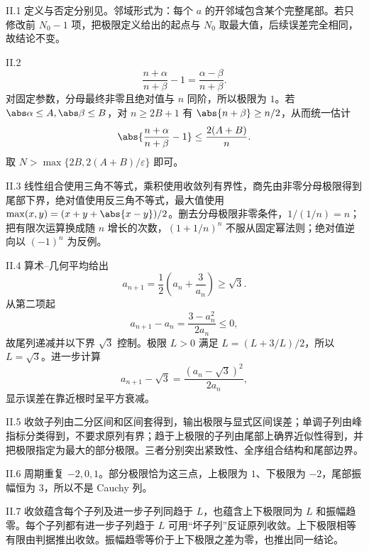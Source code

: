 \begin{solution}{II.1}
定义与否定分别见。邻域形式为：每个 \(a\) 的开邻域包含某个完整尾部。若只修改前 \(N_0-1\) 项，把极限定义给出的起点与 \(N_0\) 取最大值，后续误差完全相同，故结论不变。
\end{solution}

\begin{solution}{II.2}
\[
 \frac{n+\alpha}{n+\beta}-1=\frac{\alpha-\beta}{n+\beta}.
\]
对固定参数，分母最终非零且绝对值与 \(n\) 同阶，所以极限为 \(1\)。若
\(\abs\alpha\le A,\abs\beta\le B\)，对 \(n\ge2B+1\) 有
\(\abs{n+\beta}\ge n/2\)，从而统一估计
\[
 \abs{\frac{n+\alpha}{n+\beta}-1}
 \le\frac{2(A+B)}n.
\]
取 \(N>\max\{2B,2(A+B)/\varepsilon\}\) 即可。
\end{solution}

\begin{solution}{II.3}
线性组合使用三角不等式，乘积使用收敛列有界性，商先由非零分母极限得到尾部下界，绝对值使用反三角不等式，最大值使用
\(\max(x,y)=(x+y+\abs{x-y})/2\)。删去分母极限非零条件，\(1/(1/n)=n\)；把有限次运算换成随 \(n\) 增长的次数，\((1+1/n)^n\) 不服从固定幂法则；绝对值逆向以 \((-1)^n\) 为反例。
\end{solution}

\begin{solution}{II.4}
算术--几何平均给出
\[
 a_{n+1}=\frac12\left(a_n+\frac3{a_n}\right)\ge\sqrt3.
\]
从第二项起
\[
 a_{n+1}-a_n=\frac{3-a_n^2}{2a_n}\le0,
\]
故尾列递减并以下界 \(\sqrt3\) 控制。极限 \(L>0\) 满足
\(L=(L+3/L)/2\)，所以 \(L=\sqrt3\)。进一步计算
\[
 a_{n+1}-\sqrt3
 =\frac{(a_n-\sqrt3)^2}{2a_n},
\]
显示误差在靠近根时呈平方衰减。
\end{solution}

\begin{solution}{II.5}
收敛子列由二分区间和区间套得到，输出极限与显式区间误差；单调子列由峰指标分类得到，不要求原列有界；趋于上极限的子列由尾部上确界近似性得到，并把极限指定为最大的部分极限。三者分别突出紧致性、全序组合结构和尾部边界。
\end{solution}

\begin{solution}{II.6}
周期重复 \(-2,0,1\)。部分极限恰为这三点，上极限为 \(1\)、下极限为 \(-2\)，尾部振幅恒为 \(3\)，所以不是 Cauchy 列。
\end{solution}

\begin{solution}{II.7}
收敛蕴含每个子列及进一步子列同趋于 \(L\)，也蕴含上下极限同为 \(L\) 和振幅趋零。每个子列都有进一步子列趋于 \(L\) 可用“坏子列”反证原列收敛。上下极限相等有限由判据推出收敛。振幅趋零等价于上下极限之差为零，也推出同一结论。
\end{solution}

